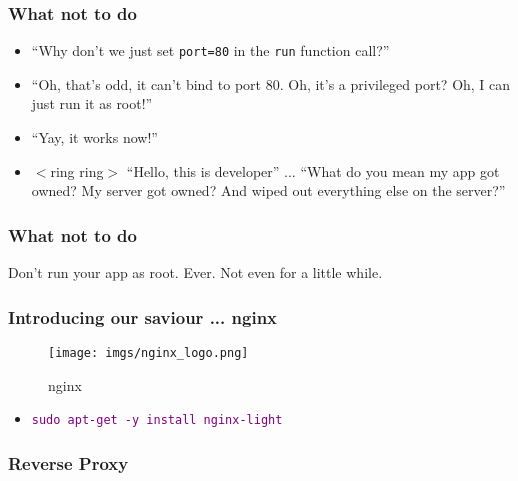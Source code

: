\documentclass{beamer}
\newcommand\aws[1]{\textcolor{purple}{\texttt{#1}}}
\begin{document}
\begin{frame}
  \frametitle{What not to do}
  \begin{itemize}
  \item<1-> ``Why don't we just set \texttt{port=80} in the \texttt{run}
    function call?''
  \item<2-> ``Oh, that's odd, it can't bind to port 80. Oh, it's a
    privileged port? Oh, I can just run it as root!''
  \item<3-> ``Yay, it works now!''
  \item<4-> $<$ring ring$>$ ``Hello, this is developer'' ... ``What do
    you mean my app got owned? My server got owned? And wiped out
    everything else on the server?''
  \end{itemize}
\end{frame}

\begin{frame}
  \frametitle{What not to do}
  {\Huge Don't run your app as root. Ever. Not even for a little
    while.}
\end{frame}

\begin{frame}
  \frametitle{Introducing our saviour ... nginx}
  \begin{figure}[h!]
    \centering
    \texttt{[image: imgs/nginx\_logo.png]}
    \caption{nginx}
    \label{fig:nginx_logo}
  \end{figure}
  \begin{itemize}
  \item \aws{sudo apt-get -y install nginx-light}
  \end{itemize}
\end{frame}

\begin{frame}
  \frametitle{Reverse Proxy}
    \begin{center}
    \end{center}
\end{frame}
\end{document}
